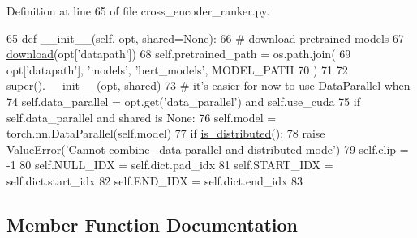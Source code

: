 Definition at line 65 of file cross\+\_\+encoder\+\_\+ranker.\+py.


\begin{DoxyCode}
65     \textcolor{keyword}{def }\_\_init\_\_(self, opt, shared=None):
66         \textcolor{comment}{# download pretrained models}
67         \hyperlink{namespaceparlai_1_1core_1_1build__data_ab74f0e428f05e5d91fa93c8afb367622}{download}(opt[\textcolor{stringliteral}{'datapath'}])
68         self.pretrained\_path = os.path.join(
69             opt[\textcolor{stringliteral}{'datapath'}], \textcolor{stringliteral}{'models'}, \textcolor{stringliteral}{'bert\_models'}, MODEL\_PATH
70         )
71 
72         super().\_\_init\_\_(opt, shared)
73         \textcolor{comment}{# it's easier for now to use DataParallel when}
74         self.data\_parallel = opt.get(\textcolor{stringliteral}{'data\_parallel'}) \textcolor{keywordflow}{and} self.use\_cuda
75         \textcolor{keywordflow}{if} self.data\_parallel \textcolor{keywordflow}{and} shared \textcolor{keywordflow}{is} \textcolor{keywordtype}{None}:
76             self.model = torch.nn.DataParallel(self.model)
77         \textcolor{keywordflow}{if} \hyperlink{namespaceparlai_1_1utils_1_1distributed_a023acb5e3b66e1f27e21247c35661279}{is\_distributed}():
78             \textcolor{keywordflow}{raise} ValueError(\textcolor{stringliteral}{'Cannot combine --data-parallel and distributed mode'})
79         self.clip = -1
80         self.NULL\_IDX = self.dict.pad\_idx
81         self.START\_IDX = self.dict.start\_idx
82         self.END\_IDX = self.dict.end\_idx
83 
\end{DoxyCode}


\subsection{Member Function Documentation}
\mbox{\label{classparlai_1_1agents_1_1bert__ranker_1_1cross__encoder__ranker_1_1CrossEncoderRankerAgent_a15c4f37715a216f5a4f37f5dbcb446f5}} 
